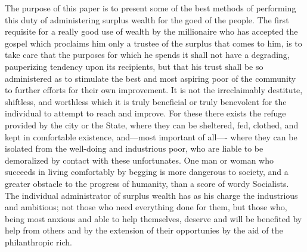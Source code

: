 \documentclass[11pt,openany]{book}
\begin{document}
The purpose of this paper is to present some of the best methods of performing this duty of administering surplus wealth for the goed of the people. The first requisite for a really good use of wealth by the millionaire who has accepted the gospel which proclaims him only a trustee of the surplus that comes to him, is to take care that the purposes for which he spends it shall not have a degrading, pauperizing tendency upon its recipients, but that his trust shall be so administered as to stimulate the best and most aspiring poor of the community to further efforts for their own improvement. It is not the irreclaimably destitute, shiftless, and worthless which it is truly beneficial or truly benevolent for the individual to attempt to reach and improve. For these there exists the refuge provided by the city or the State, where they can be sheltered, fed, clothed, and kept in comfortable existence, and---most important of all---- where they can be isolated from the well-doing and industrious poor, who are liable to be demoralized by contact with these unfortunates. One man or woman who succeeds in living comfortably by begging is more dangerous to society, and a greater obstacle to the progress of humanity, than a score of wordy Socialists. The individual administrator of surplus wealth has as his charge the industrious and ambitious; not those who need everything done for them, but those who, being most anxious and able to help themselves, deserve and will be benefited by help from others and by the extension of their opportunies by the aid of the philanthropic rich.
\end{document}
